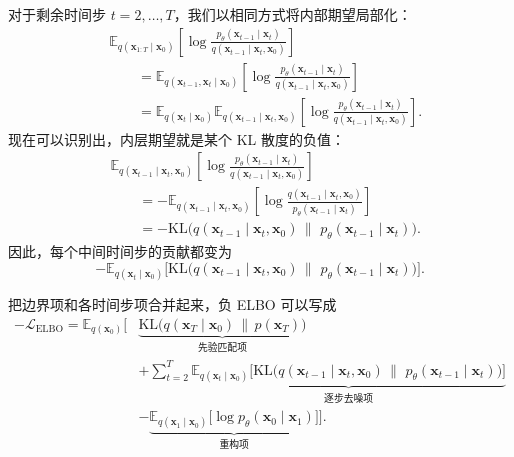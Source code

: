 对于剩余时间步 $t=2,\dots,T$，我们以相同方式将内部期望局部化：
\[
\begin{aligned}
&\mathbb{E}_{q(\mathbf{x}_{1:T}\mid \mathbf{x}_0)}
\!\left[
\log
\frac{
p_\theta(\mathbf{x}_{t-1}\mid \mathbf{x}_t)
}{
q(\mathbf{x}_{t-1}\mid \mathbf{x}_t,\mathbf{x}_0)
}
\right] \\[6pt]
&\qquad=
\mathbb{E}_{q(\mathbf{x}_{t-1},\mathbf{x}_t\mid \mathbf{x}_0)}
\!\left[
\log
\frac{
p_\theta(\mathbf{x}_{t-1}\mid \mathbf{x}_t)
}{
q(\mathbf{x}_{t-1}\mid \mathbf{x}_t,\mathbf{x}_0)
}
\right] \\[6pt]
&\qquad=
\mathbb{E}_{q(\mathbf{x}_t\mid \mathbf{x}_0)}
\mathbb{E}_{q(\mathbf{x}_{t-1}\mid \mathbf{x}_t,\mathbf{x}_0)}
\!\left[
\log
\frac{
p_\theta(\mathbf{x}_{t-1}\mid \mathbf{x}_t)
}{
q(\mathbf{x}_{t-1}\mid \mathbf{x}_t,\mathbf{x}_0)
}
\right].
\end{aligned}
\]
现在可以识别出，内层期望就是某个 KL 散度的负值：
\[
\begin{aligned}
&\mathbb{E}_{q(\mathbf{x}_{t-1}\mid \mathbf{x}_t,\mathbf{x}_0)}
\!\left[
\log
\frac{
p_\theta(\mathbf{x}_{t-1}\mid \mathbf{x}_t)
}{
q(\mathbf{x}_{t-1}\mid \mathbf{x}_t,\mathbf{x}_0)
}
\right] \\[4pt]
&\qquad=
-\mathbb{E}_{q(\mathbf{x}_{t-1}\mid \mathbf{x}_t,\mathbf{x}_0)}
\!\left[
\log
\frac{
q(\mathbf{x}_{t-1}\mid \mathbf{x}_t,\mathbf{x}_0)
}{
p_\theta(\mathbf{x}_{t-1}\mid \mathbf{x}_t)
}
\right] \\[4pt]
&\qquad=
-\mathrm{KL}\!\big(
q(\mathbf{x}_{t-1}\mid \mathbf{x}_t,\mathbf{x}_0)
\,\|\,\,
p_\theta(\mathbf{x}_{t-1}\mid \mathbf{x}_t)
\big).
\end{aligned}
\]
因此，每个中间时间步的贡献都变为
\[
-
\mathbb{E}_{q(\mathbf{x}_t\mid \mathbf{x}_0)}
\Big[
\mathrm{KL}\!\big(
q(\mathbf{x}_{t-1}\mid \mathbf{x}_t,\mathbf{x}_0)
\,\|\,\,
p_\theta(\mathbf{x}_{t-1}\mid \mathbf{x}_t)
\big)
\Big].
\]

把边界项和各时间步项合并起来，负 ELBO 可以写成
\[
\begin{aligned}
-\mathcal{L}_{\mathrm{ELBO}}
=
\mathbb{E}_{q(\mathbf{x}_0)}
\Big[
&\underbrace{
\mathrm{KL}\!\bigl(
q(\mathbf{x}_T\mid \mathbf{x}_0)\,\|\,p(\mathbf{x}_T)
\bigr)
}_{\text{先验匹配项}}
\\[4pt]
&+
\sum_{t=2}^{T}
\underbrace{
\mathbb{E}_{q(\mathbf{x}_t\mid \mathbf{x}_0)}
\Big[
\mathrm{KL}\!\big(
q(\mathbf{x}_{t-1}\mid \mathbf{x}_t,\mathbf{x}_0)
\,\|\,\,
p_\theta(\mathbf{x}_{t-1}\mid \mathbf{x}_t)
\big)
\Big]
}_{\text{逐步去噪项}}
\\[4pt]
&-
\underbrace{
\mathbb{E}_{q(\mathbf{x}_1\mid \mathbf{x}_0)}
\big[
\log p_\theta(\mathbf{x}_0\mid \mathbf{x}_1)
\big]
}_{\text{重构项}}
\Big].
\end{aligned}
\]


